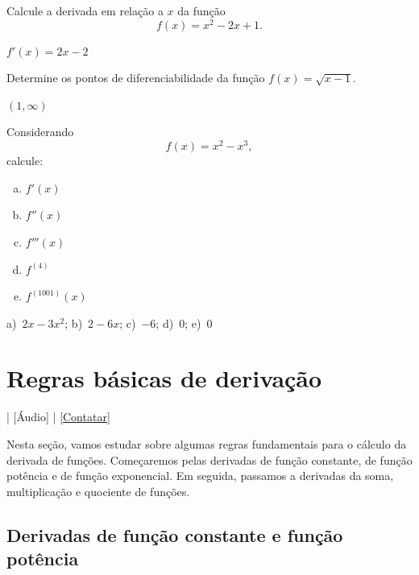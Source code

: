 \begin{exer}
  Calcule a derivada em relação a $x$ da função
  \begin{equation}
    f(x) = x^2 - 2x + 1.
  \end{equation}
\end{exer}
\begin{resp}
  $f'(x) = 2x - 2$
\end{resp}

\begin{exer}
  Determine os pontos de diferenciabilidade da função $f(x) = \sqrt{x-1}$.
\end{exer}
\begin{resp}
  $(1, \infty)$
\end{resp}

\begin{exer}
  Considerando
  \begin{equation}
    f(x) = x^2-x^3,
  \end{equation}
  calcule:
  \begin{enumerate}[a)]
  \item $f'(x)$
  \item $f''(x)$
  \item $f'''(x)$
  \item $f^{(4)}$
  \item $f^{(1001)}(x)$
  \end{enumerate}
\end{exer}
\begin{resp}
  a)~$2x-3x^2$; b)~$2-6x$; c)~$-6$; d)~$0$; e)~$0$
\end{resp}

\section{Regras básicas de derivação}\label{cap_deriv_sec_regras}

\begin{flushright}
  [Vídeo] | [Áudio] | \href{https://phkonzen.github.io/notas/contato.html}{[Contatar]}
\end{flushright}

Nesta seção, vamos estudar sobre algumas regras fundamentais para o cálculo da derivada de funções. Começaremos pelas derivadas de função constante, de função potência e de função exponencial. Em seguida, passamos a derivadas da soma, multiplicação e quociente de funções.

\subsection{Derivadas de função constante e função potência}

